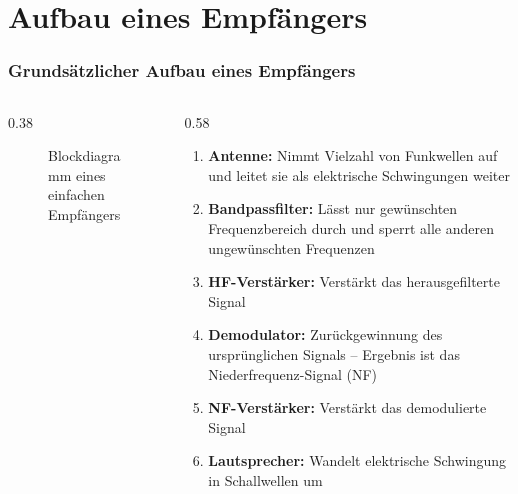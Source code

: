 
\section{Aufbau eines Empfängers}
\label{section:aufbau_empfaenger}
\begin{frame}%

\frametitle{Grundsätzlicher Aufbau eines Empfängers}
\begin{columns}
    \begin{column}{0.38\textwidth}
        \begin{figure}
            \caption{\scriptsize Blockdiagramm eines einfachen Empfängers}
            \label{aufbau_empfaenger_blockdiagramm}
        \end{figure}
    \end{column}
    \begin{column}{0.58\textwidth}
        \small
        \begin{enumerate}[<+->]
            \item \textbf{Antenne:} Nimmt Vielzahl von Funkwellen auf und leitet sie als
            elektrische Schwingungen weiter
            \item \textbf{Bandpassfilter:} Lässt nur gewünschten Frequenzbereich
            durch und sperrt alle anderen ungewünschten Frequenzen
            \item \textbf{HF-Verstärker:} Verstärkt das herausgefilterte Signal
            \item \textbf{Demodulator:} Zurückgewinnung des ursprünglichen
            Signals -- Ergebnis ist das Niederfrequenz-Signal (NF)
            \item \textbf{NF-Verstärker:} Verstärkt das demodulierte Signal
            \item \textbf{Lautsprecher:} Wandelt elektrische Schwingung in Schallwellen um
        \end{enumerate}
    \end{column}
\end{columns}
\end{frame}

\begin{frame}
\end{frame}

